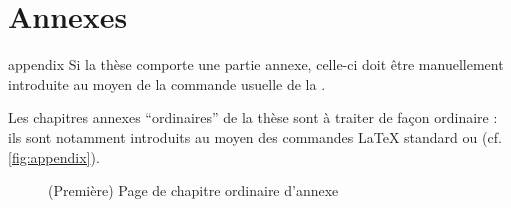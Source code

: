\chapter{Annexes}\label{cha:annexes}

\begin{docCommand}{appendix}{}
  Si la thèse comporte une partie annexe, celle-ci doit être manuellement
  introduite au moyen de la commande usuelle  de la
  \nofrontmatter.
\end{docCommand}

Les chapitres annexes \enquote{ordinaires} de la thèse sont à traiter de façon
ordinaire : ils sont notamment introduits au moyen des commandes \LaTeX{}
standard  ou  (cf.
\vref{fig:appendix}).

\begin{figure}[htbp]
  \centering
    \caption[Chapitre ordinaire d'annexe]{(Première) Page de chapitre
      ordinaire d'annexe}
  \label{fig:appendix}
\end{figure}

%
\iffalse
\fi
